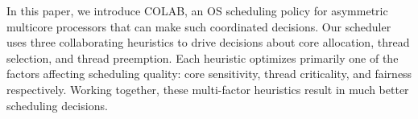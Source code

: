 

In this paper, we introduce COLAB, an OS scheduling policy for asymmetric multicore processors that can make such coordinated decisions. Our scheduler uses three collaborating heuristics to drive decisions about core allocation, thread selection, and thread preemption. Each heuristic optimizes primarily one of the factors affecting scheduling quality: core sensitivity, thread criticality, and fairness respectively. Working together, these multi-factor heuristics result in much better scheduling decisions.

